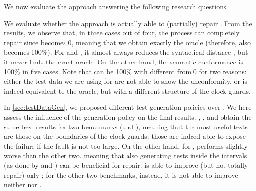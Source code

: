\begin{tikzborder}{\cite{Gargantini16:validation}}
\begin{tikzborder}{\cite{gargantini_combinatorial_2017}}
\begin{tikzborder}{\cite{garn2019}}
\begin{tikzborder}{\cite{arcaini2019achieving}}
\begin{tikzborder}{\cite{arcaini2019varivolution}}
\begin{tikzborder}{}
We now evaluate the approach answering the following research questions.

We evaluate whether the approach is actually able to (partially) repair \initTa. From the results, we observe that, in three cases out of four, the process can completely repair \benchmarkExampleShort since \syntDist becomes 0, meaning that we obtain exactly the oracle (therefore, also \semConf becomes 100\%). For \benchmarkCoffeeShort and \benchmarkCarAlarmShort, it almost always reduces the syntactical distance \syntDist, but it never finds the exact oracle. On the other hand, the semantic conformance \semConf is 100\% in five cases. Note that \semConf can be 100\% with \syntDist different from 0 for two reasons: either the test data \testDataConf we are using for \semConf are not able to show the unconformity, or \repTa is indeed equivalent to the oracle, but with a different structure of the clock guards.


In \ref{sec:testDataGen}, we proposed different test generation policies over \epzg. We here assess the influence of the generation policy on the final results. \policyminusplus, \policymiddle, and \policyquarter obtain the same best results for two benchmarks (\benchmarkExampleShort and \benchmarkCarAlarmShort), meaning that the most useful tests are those on the boundaries of the clock guards: those are indeed able to expose the failure if the fault is not too large. On the other hand, for \benchmarkCoffeeShort, \policyminusplus performs slightly worse than the other two, meaning that also generating tests inside the intervals (as done by \policymiddle and \policyquarter) can be beneficial for repair. \policyrand is able to improve (but not totally repair) only \benchmarkCoffeeShort; for the other two benchmarks, instead, it is not able to improve neither \syntDist nor \semConf.


\end{tikzborder}
\end{tikzborder}
\end{tikzborder}
\end{tikzborder}
\end{tikzborder}
\end{tikzborder}

